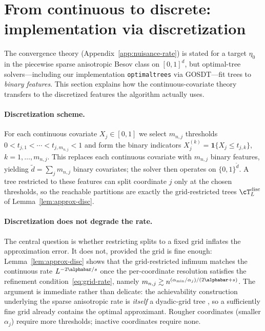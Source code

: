 
\section{From continuous to discrete: implementation via discretization}
\label{sec:discretization}

The convergence theory (Appendix~\ref{app:nuisance-rate}) is stated for a
target $\eta_0$ in the piecewise sparse anisotropic Besov class on $[0,1]^d$,
but optimal-tree solvers---including our implementation \texttt{optimaltrees}
via GOSDT---fit trees to \emph{binary features}. This section explains how the
continuous-covariate theory transfers to the discretized features the algorithm
actually uses.

\paragraph{Discretization scheme.}
For each continuous covariate $X_j \in [0,1]$ we select $m_{n,j}$ thresholds
$0 < t_{j,1} < \cdots < t_{j,m_{n,j}} < 1$ and form the binary indicators
$X_j^{(k)} = \mathbf 1\{X_j \le t_{j,k}\}$, $k = 1, \dots, m_{n,j}$. This
replaces each continuous covariate with $m_{n,j}$ binary features, yielding
$\tilde d = \sum_j m_{n,j}$ binary covariates; the solver then operates on
$\{0,1\}^{\tilde d}$. A tree restricted to these features can split coordinate
$j$ only at the chosen thresholds, so the reachable partitions are exactly the
grid-restricted trees $\cT_L^{\mathrm{disc}}$ of Lemma~\ref{lem:approx-disc}.

\paragraph{Discretization does not degrade the rate.}
The central question is whether restricting splits to a fixed grid inflates the
approximation error. It does not, provided the grid is fine enough:
Lemma~\ref{lem:approx-disc} shows that the grid-restricted infimum matches the
continuous rate $L^{-2\alphabar/s}$ once the per-coordinate resolution satisfies
the refinement condition~\eqref{eq:grid-rate}, namely
$m_{n,j} \gtrsim n^{(\alpha_{\min}/\alpha_j)/(2\alphabar + s)}$. The argument is
immediate rather than delicate: the achievability construction underlying the
sparse anisotropic rate is \emph{itself} a dyadic-grid tree
\citep{xuStatisticalOptimalityOptimal2026}, so a sufficiently fine grid already
contains the optimal approximant. Rougher coordinates (smaller $\alpha_j$)
require more thresholds; inactive coordinates require none.

